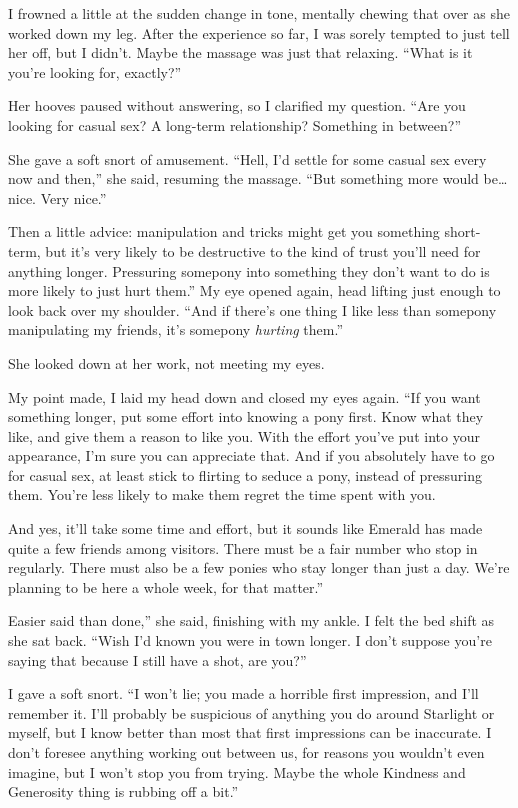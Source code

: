 I frowned a little at the sudden change in tone, mentally chewing that over as she worked down my leg. After the experience so far, I was sorely tempted to just tell her off, but I didn’t. Maybe the massage was just that relaxing. “What is it you’re looking for, exactly?”

Her hooves paused without answering, so I clarified my question. “Are you looking for casual sex? A long-term relationship? Something in between?”

She gave a soft snort of amusement. “Hell, I’d settle for some casual sex every now and then,” she said, resuming the massage. “But something more would be… nice. Very nice.”

\leavevmode{}Then a little advice: manipulation and tricks might get you something short-term, but it’s very likely to be destructive to the kind of trust you’ll need for anything longer. Pressuring somepony into something they don’t want to do is more likely to just hurt them.” My eye opened again, head lifting just enough to look back over my shoulder. “And if there’s one thing I like less than somepony manipulating my friends, it’s somepony \textit{hurting} them.”

She looked down at her work, not meeting my eyes.

My point made, I laid my head down and closed my eyes again. “If you want something longer, put some effort into knowing a pony first. Know what they like, and give them a reason to like you. With the effort you’ve put into your appearance, I’m sure you can appreciate that. And if you absolutely have to go for casual sex, at least stick to flirting to seduce a pony, instead of pressuring them. You’re less likely to make them regret the time spent with you.

\leavevmode{}And yes, it’ll take some time and effort, but it sounds like Emerald has made quite a few friends among visitors. There must be a fair number who stop in regularly. There must also be a few ponies who stay longer than just a day. We’re planning to be here a whole week, for that matter.”

\leavevmode{}Easier said than done,” she said, finishing with my ankle. I felt the bed shift as she sat back. “Wish I’d known you were in town longer. I don’t suppose you’re saying that because I still have a shot, are you?”

I gave a soft snort. “I won’t lie; you made a horrible first impression, and I’ll remember it. I’ll probably be suspicious of anything you do around Starlight or myself, but I know better than most that first impressions can be inaccurate. I don’t foresee anything working out between us, for reasons you wouldn’t even imagine, but I won’t stop you from trying. Maybe the whole Kindness and Generosity thing is rubbing off a bit.”

